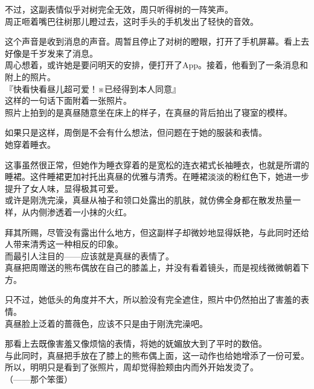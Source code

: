 不过，这副表情似乎对树完全无效，周只听得树的一阵笑声。\\

周正咂着嘴巴往树那儿瞪过去，这时手头的手机发出了轻快的音效。

这个声音是收到消息的声音。周暂且停止了对树的瞪眼，打开了手机屏幕。看上去好像是千岁发来了消息。\\

周心想着，或许她是要问明天的安排，便打开了App。接着，他看到了一条消息和附上的照片。\\

『快看快看昼儿超可爱！※已经得到本人同意』\\

这样的一句话下面附着一张照片。\\

照片上拍到的是真昼随意坐在床上的样子，在真昼的背后拍出了寝室的模样。

如果只是这样，周倒是不会有什么想法，但问题在于她的服装和表情。\\

她穿着睡衣。

这事虽然很正常，但她作为睡衣穿着的是宽松的连衣裙式长袖睡衣，也就是所谓的睡裙。这件睡裙更加衬托出真昼的优雅与清秀。在睡裙淡淡的粉红色下，她进一步提升了女人味，显得极其可爱。\\

或许是刚洗完澡，真昼从袖子和领口处露出的肌肤，就仿佛全身都在散发热量一样，从内侧渗透着一小抹的火红。

拜其所赐，尽管没有露出什么地方，但这副样子却微妙地显得妖艳，与此同时还给人带来清秀这一种相反的印象。\\

而最引人注目的——应该就是真昼的表情了。\\

真昼把周赠送的熊布偶放在自己的膝盖上，并没有看着镜头，而是视线微微朝着下方。

只不过，她低头的角度并不大，所以脸没有完全遮住，照片中仍然拍出了害羞的表情。\\

真昼脸上泛着的蔷薇色，应该不只是由于刚洗完澡吧。

那看上去既像害羞又像烦恼的表情，将她的妩媚放大到了平时的数倍。\\

与此同时，真昼把手放在了膝上的熊布偶上面，这一动作也给她增添了一份可爱。所以，明明只是看到了张照片，周却觉得脸颊由内而外开始发烫了。\\

（——那个笨蛋）\\

